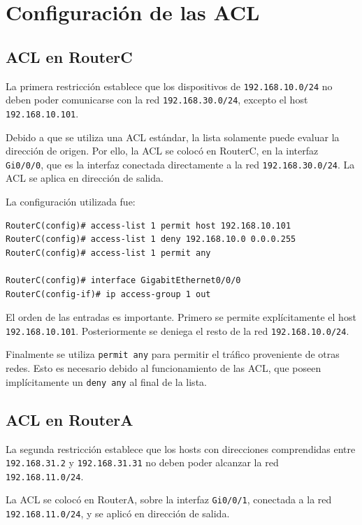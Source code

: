 \documentclass[12pt]{article}
\begin{document}
\section{Configuración de las ACL}

\subsection{ACL en RouterC}

La primera restricción establece que los dispositivos de
\texttt{192.168.10.0/24} no deben poder comunicarse con la red
\texttt{192.168.30.0/24}, excepto el host
\texttt{192.168.10.101}.

Debido a que se utiliza una ACL estándar, la lista solamente puede evaluar la
dirección de origen. Por ello, la ACL se colocó en RouterC, en la interfaz
\texttt{Gi0/0/0}, que es la interfaz conectada directamente a la red
\texttt{192.168.30.0/24}. La ACL se aplica en dirección de salida.

La configuración utilizada fue:

\begin{verbatim}
RouterC(config)# access-list 1 permit host 192.168.10.101
RouterC(config)# access-list 1 deny 192.168.10.0 0.0.0.255
RouterC(config)# access-list 1 permit any

RouterC(config)# interface GigabitEthernet0/0/0
RouterC(config-if)# ip access-group 1 out
\end{verbatim}

El orden de las entradas es importante. Primero se permite explícitamente el
host \texttt{192.168.10.101}. Posteriormente se deniega el resto de la red
\texttt{192.168.10.0/24}.

Finalmente se utiliza \texttt{permit any} para permitir el tráfico proveniente
de otras redes. Esto es necesario debido al funcionamiento de las ACL, que
poseen implícitamente un \texttt{deny any} al final de la lista.

\subsection{ACL en RouterA}

La segunda restricción establece que los hosts con direcciones comprendidas
entre \texttt{192.168.31.2} y \texttt{192.168.31.31} no deben poder alcanzar
la red \texttt{192.168.11.0/24}.

La ACL se colocó en RouterA, sobre la interfaz \texttt{Gi0/0/1}, conectada a
la red \texttt{192.168.11.0/24}, y se aplicó en dirección de salida.
\end{document}
